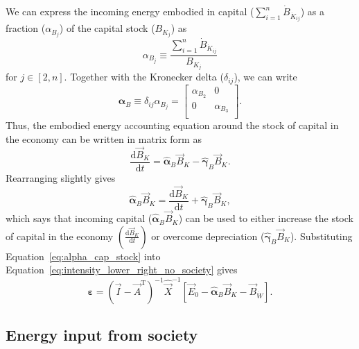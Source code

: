 We can express the incoming energy embodied in capital ($\sum_{i=1}^{n} \dot{B}_{\dot{K}_{ij}}$)
as a fraction ($\alpha_{B_{j}}$) of the capital stock ($B_{K_{j}}$) as
%
\begin{equation}
	\alpha_{B_{j}}
	\equiv 
	\frac{\sum\limits_{i=1}^{n} \dot{B}_{\dot{K}_{ij}}} {B_{K_{j}}}
\end{equation}
%
for $j \in [2,n]$.
Together with the Kronecker delta ($\delta_{ij}$), we can write
%
\begin{equation}
	\hat{\boldsymbol{\alpha}}_{B}
	\equiv
	\delta_{ij} \alpha_{B_{j}}
	=
	\begin{bmatrix}
		\alpha_{B_{2}}	& 0               \\
		0               & \alpha_{B_{3}}  \\
	\end{bmatrix}.
\end{equation}
%
Thus, the embodied energy accounting equation around
the stock of capital in the economy can be written in matrix form as
%
\begin{equation}
	\frac{\mathrm{d}\vec{B}_{K}}{\mathrm{d}t}
	= \hat{\boldsymbol{\alpha}}_{B} \vec{B}_{K}
	- \hat{\boldsymbol{\gamma}}_{B} \vec{B}_{K}.
\end{equation}
%
Rearranging slightly gives
%
\begin{equation} \label{eq:alpha_cap_stock}
	\hat{\boldsymbol{\alpha}}_{B} \vec{B}_{K}
	= \frac{\mathrm{d}\vec{B}_{K}}{\mathrm{d}t}
	+ \hat{\boldsymbol{\gamma}}_{B} \vec{B}_{K},
\end{equation}
%
which says that incoming capital ($\hat{\boldsymbol{\alpha}}_{B} \vec{B}_{K}$)
can be used to either
increase the stock of capital in the economy 
$\left( \frac{\mathrm{d}\vec{B}_{K}}{\mathrm{d}t} \right)$
or overcome depreciation ($\hat{\boldsymbol{\gamma}}_{B} \vec{B}_{K}$).
Substituting Equation~\ref{eq:alpha_cap_stock} into
Equation~\ref{eq:intensity_lower_right_no_society} gives
%
\begin{equation} \label{eq:epsilon_leontief_with_A_alpha}
	\boldsymbol{\varepsilon} 
	= {(\vec{I} - \vec{A}^{\mathrm{T}})}^{-1}\hat{\vec{X}}^{-1}
		\left[\vec{E}_{0} 
				- \hat{\boldsymbol{\alpha}}_{B} \vec{B}_{K}
				- \vec{B}_{\dot{W}}
		\right].
\end{equation}


\subsection{Energy input from society}
\label{sec:energy_from_society}

